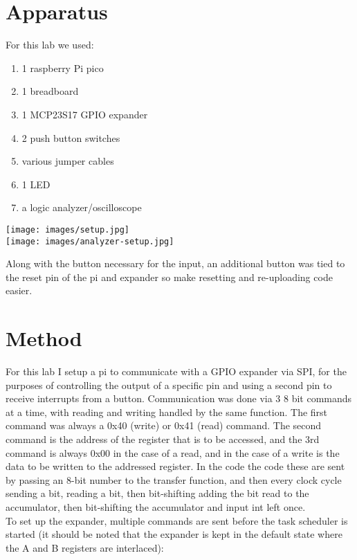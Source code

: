 \documentclass[sigconf]{article}
\begin{document}
\section*{Apparatus}

For this lab we used:
\begin{enumerate}
  \item 1 raspberry Pi pico 
  \item 1 breadboard
  \item 1 MCP23S17 GPIO expander
  \item 2 push button switches
  \item various jumper cables
  \item 1 LED
  \item a logic analyzer/oscilloscope
\end{enumerate}

\texttt{[image: images/setup.jpg]} \\
\texttt{[image: images/analyzer-setup.jpg]}

Along with the button necessary for the input, an additional button was tied to the reset pin of the pi and expander so make resetting and re-uploading code easier.


\section*{Method}

For this lab I setup a pi to communicate with a GPIO expander via SPI, for the purposes of controlling the output of a specific pin and using a second pin to receive interrupts from a button. Communication was done via 3 8 bit commands at a time, with reading and writing handled by the same function. The first command was always a 0x40 (write) or 0x41 (read) command. The second command is the address of the register that is to be accessed, and the 3rd command is always 0x00 in the case of a read, and in the case of a write is the data to be written to the addressed register. In the code the code these are sent by passing an 8-bit number to the transfer function, and then every clock cycle sending a bit, reading a bit, then bit-shifting adding the bit read to the accumulator, then bit-shifting the accumulator and input int left once. \\
To set up the expander, multiple commands are sent before the task scheduler is started (it should be noted that the expander is kept in the default state where the A and B registers are interlaced): 
\end{document}
